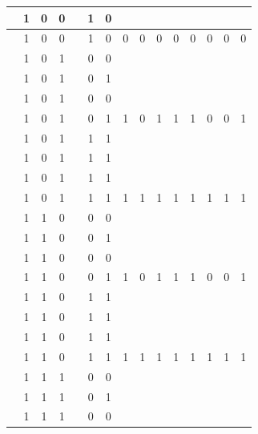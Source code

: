 \begin{table}[!tb]
\begin{tabular}{|c|c|c|c|c|c|c|c|c|c|c|c|c|c|c|}
        \rowcolor{yellow!40}  & 1 & 0 & 0 &  & 1 & 0 &  &  &  &  &  &  &  &  \\ \hline
        \rowcolor{yellow!40}  & 1 & 0 & 0 &  & 1 & 0 & 0 & 0 & 0 & 0 & 0 & 0 & 0 & 0 \\ \hline
        \rowcolor{gray!40}  & 1 & 0 & 1 &  & 0 & 0 &  &  &  &  &  &  &  &  \\ \hline
        \rowcolor{gray!40}  & 1 & 0 & 1 &  & 0 & 1 &  &  &  &  &  &  &  &  \\ \hline
        \rowcolor{gray!40}  & 1 & 0 & 1 &  & 0 & 0 &  &  &  &  &  &  &  &  \\ \hline
        \rowcolor{gray!40}  & 1 & 0 & 1 &  & 0 & 1 & 1 & 0 & 1 & 1 & 1 & 0 & 0 & 1 \\ \hline
        \rowcolor{blue!40}  & 1 & 0 & 1 &  & 1 & 1 &  &  &  &  &  &  &  &  \\ \hline
        \rowcolor{blue!40}  & 1 & 0 & 1 &  & 1 & 1 &  &  &  &  &  &  &  &  \\ \hline
        \rowcolor{blue!40}  & 1 & 0 & 1 &  & 1 & 1 &  &  &  &  &  &  &  &  \\ \hline
        \rowcolor{blue!40}  & 1 & 0 & 1 &  & 1 & 1 & 1 & 1 & 1 & 1 & 1 & 1 & 1 & 1 \\ \hline
        \rowcolor{red!40}  & 1 & 1 & 0 &  & 0 & 0 &  &  &  &  &  &  &  &  \\ \hline
        \rowcolor{red!40}  & 1 & 1 & 0 &  & 0 & 1 &  &  &  &  &  &  &  &  \\ \hline
        \rowcolor{red!40}  & 1 & 1 & 0 &  & 0 & 0 &  &  &  &  &  &  &  &  \\ \hline
        \rowcolor{red!40}  & 1 & 1 & 0 &  & 0 & 1 & 1 & 0 & 1 & 1 & 1 & 0 & 0 & 1 \\ \hline
        \rowcolor{green!40}  & 1 & 1 & 0 &  & 1 & 1 &  &  &  &  &  &  &  &  \\ \hline
        \rowcolor{green!40}  & 1 & 1 & 0 &  & 1 & 1 &  &  &  &  &  &  &  &  \\ \hline
        \rowcolor{green!40}  & 1 & 1 & 0 &  & 1 & 1 &  &  &  &  &  &  &  &  \\ \hline
        \rowcolor{green!40}  & 1 & 1 & 0 &  & 1 & 1 & 1 & 1 & 1 & 1 & 1 & 1 & 1 & 1 \\ \hline
        \rowcolor{yellow!40}  & 1 & 1 & 1 &  & 0 & 0 &  &  &  &  &  &  &  &  \\ \hline
        \rowcolor{yellow!40}  & 1 & 1 & 1 &  & 0 & 1 &  &  &  &  &  &  &  &  \\ \hline
        \rowcolor{yellow!40}  & 1 & 1 & 1 &  & 0 & 0 &  &  &  &  &  &  &  &  \\ \hline

\end{tabular}
\end{table}
